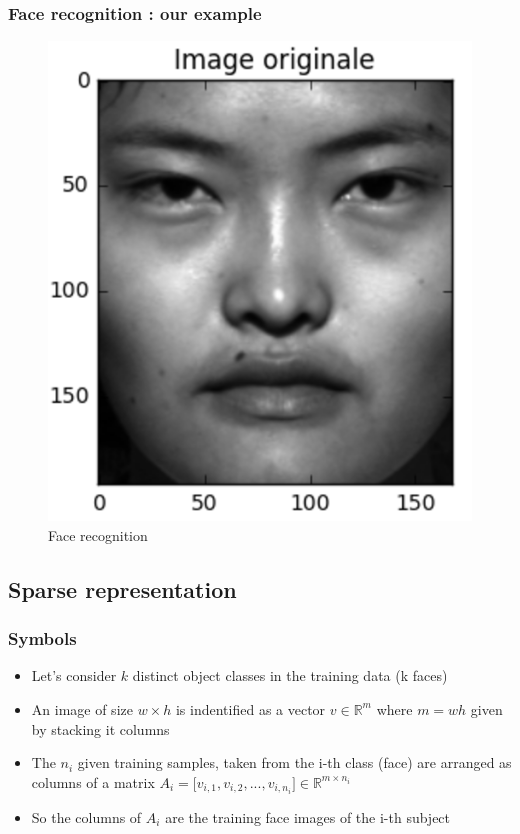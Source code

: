 \documentclass{beamer}
\begin{document}
\begin{frame}
\frametitle{Face recognition : our example}

			\begin{figure}[!ht]
			\begin{center}
			\includegraphics[scale=0.5]{original.png}
			\end{center}
			\caption{Face recognition}
			\label{fa}
			\end{figure}
\end{frame}

	\subsection{Sparse representation}
		
	
		\begin{frame}
		\frametitle{Symbols}
		
			\begin{itemize}
				\item Let's consider $k$ distinct object classes in the training data (k faces)
				\item An image of size $w \times h$  is indentified as a vector $v \in \mathbb{R}^{m}$ where $m=wh$ given by stacking it columns
				\item The $n_{i}$ given training samples, taken from the i-th class (face) are arranged as columns of a matrix $A_{i}=\lbrack v_{i,1},v_{i,2},...,v_{i,n_{i}} \rbrack \in \mathbb{R}^{m \times n_{i}} $
				\item So the columns of $A_{i}$ are the training face images of the i-th subject
				
			\end{itemize}

		\end{frame}
\end{document}
